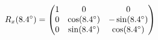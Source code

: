 \documentclass[preview]{standalone}
\begin{document}
\begin{align*}
\special{dvisvgm:raw <g id='unique000'>}R_x(8.4^\circ) = \begin{pmatrix} 1 & 0 & 0 \\ 0 & \cos(8.4^\circ) & -\sin(8.4^\circ) \\ 0 & \sin(8.4^\circ) & \cos(8.4^\circ) \end{pmatrix}\special{dvisvgm:raw </g>}
\end{align*}
\end{document}
